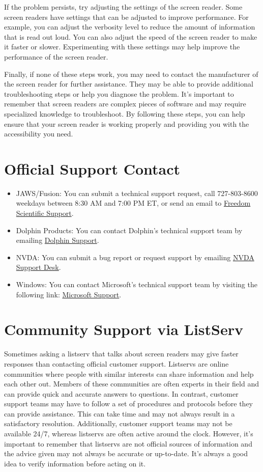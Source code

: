 If the problem persists, try adjusting the settings of the screen reader. Some screen readers have settings that can be adjusted to improve performance. For example, you can adjust the verbosity level to reduce the amount of information that is read out loud. You can also adjust the speed of the screen reader to make it faster or slower. Experimenting with these settings may help improve the performance of the screen reader.

Finally, if none of these steps work, you may need to contact the manufacturer of the screen reader for further assistance. They may be able to provide additional troubleshooting steps or help you diagnose the problem. It’s important to remember that screen readers are complex pieces of software and may require specialized knowledge to troubleshoot. By following these steps, you can help ensure that your screen reader is working properly and providing you with the accessibility you need.

\section{Official Support Contact}\label{report}
\begin{itemize}
 \item JAWS/Fusion: You can submit a technical support request, call 727-803-8600 weekdays between 8:30 AM and 7:00 PM ET, or send an email to \href{mailto:support@freedomscientific.com}{Freedom Scientific Support}.
 \item Dolphin Products: You can contact Dolphin’s technical support team by emailing \href{mailto:support@yourdolphin.com}{Dolphin Support}.
 \item NVDA: You can submit a bug report or request support by emailing \href{mailto:info@nvaccess.org}{NVDA Support Desk}.
 \item Windows: You can contact Microsoft’s technical support team by visiting the following link: \href{http://support.microsoft.com/en-us/contactus/}{Microsoft Support}.
\end{itemize}
\section{Community Support via ListServ}\label{listserv}
Sometimes asking a listserv that talks about screen readers may give faster responses than contacting official customer support. Listservs are online communities where people with similar interests can share information and help each other out. Members of these communities are often experts in their field and can provide quick and accurate answers to questions. In contrast, customer support teams may have to follow a set of procedures and protocols before they can provide assistance. This can take time and may not always result in a satisfactory resolution. Additionally, customer support teams may not be available 24/7, whereas listservs are often active around the clock. However, it’s important to remember that listservs are not official sources of information and the advice given may not always be accurate or up-to-date. It’s always a good idea to verify information before acting on it.

